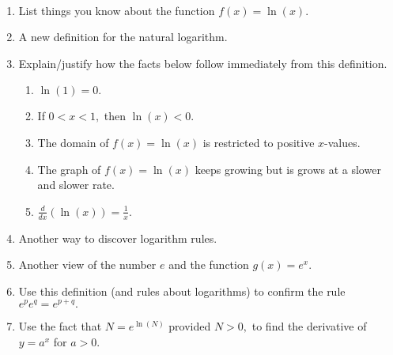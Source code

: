 \documentclass[11pt,fleqn]{article}
\begin{document}
\renewcommand{\headrulewidth}{0pt}
\newcommand{\blank}[1]{\rule{#1}{0.75pt}}
\newcommand{\bc}{\begin{center}}
\newcommand{\ec}{\end{center}}
\renewcommand{\d}{\displaystyle}

\vspace*{-0.7in}

\begin{center}
  \large
  \\
   
\end{center}

\begin{enumerate}
\item List things you know about the function $f(x)=\ln(x)$.
\vspace{1.5in}
\item A new definition for the natural logarithm.
\vspace{1.5in}
\item Explain/justify how the facts below follow immediately from this definition.
	\begin{enumerate}	
	\item $\ln(1)=0.$
	\vfill
	\item If $0 < x <1,$ then $\ln(x) < 0.$
	\vfill
	\item The domain of $f(x)=\ln(x)$ is restricted to positive $x$-values.
	\vfill
	\item The graph of $f(x)=\ln(x)$ keeps growing but is grows at a slower and slower rate.
	\vfill
	\item $\frac{d}{dx} \left( \ln(x) \right) = \frac{1}{x}.$
	\vfill
	\end{enumerate}
\newpage
\item Another way to discover logarithm rules.
\vspace{1.5in}
\item Another view of the number $e$ and the function $g(x)=e^x.$
\vfill
\item Use this definition (and rules about logarithms) to confirm the rule $e^pe^q=e^{p+q}.$
\vfill
\item Use the fact that $N=e^{\ln(N)}$ provided $N>0,$ to find the derivative of $y=a^x$ for $a>0.$
\vfill
\end{enumerate}
\end{document}
